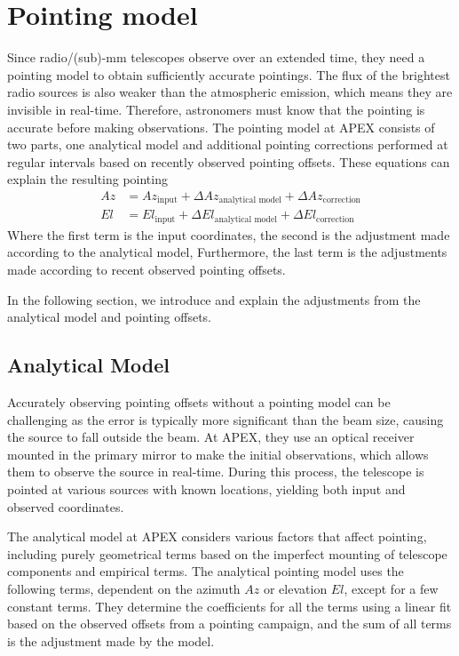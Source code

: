 \section{Pointing model}
Since radio/(sub)-mm telescopes observe over an extended time, they need a pointing model to obtain sufficiently accurate pointings.
The flux of the brightest radio sources is also weaker than the atmospheric emission, which means they are invisible in real-time.
Therefore, astronomers must know that the pointing is accurate before making observations.
The pointing model at APEX consists of two parts, one analytical model and additional pointing corrections performed at regular intervals based on recently observed pointing offsets.
These equations can explain the resulting pointing
\begin{align}
    Az &= Az_\text{input} + \Delta Az_\text{analytical model} + \Delta Az_\text{correction} \\ 
    El &= El_\text{input} + \Delta El_\text{analytical model} + \Delta El_\text{correction}
\end{align}
Where the first term is the input coordinates, the second is the adjustment made according to the analytical model,
Furthermore, the last term is the adjustments made according to recent observed pointing offsets.

In the following section, we introduce and explain the adjustments from the analytical model and pointing offsets. 


\subsection{Analytical Model}

Accurately observing pointing offsets without a pointing model can be challenging as the error is typically more significant than the beam size, causing the source to fall outside the beam. At APEX,  they use an optical receiver mounted in the primary mirror to make the initial observations, which allows them to observe the source in real-time.
During this process, the telescope is pointed at various sources with known locations, yielding both input and observed coordinates.

The analytical model at APEX considers various factors that affect pointing, including purely geometrical terms based on the imperfect mounting of telescope components and empirical terms.
The analytical pointing model uses the following terms, dependent on the azimuth $Az$ or elevation $El$, except for a few constant terms.
They determine the coefficients for all the terms using a linear fit based on the observed offsets from a pointing campaign, and the sum of all terms is the adjustment made by the model.

